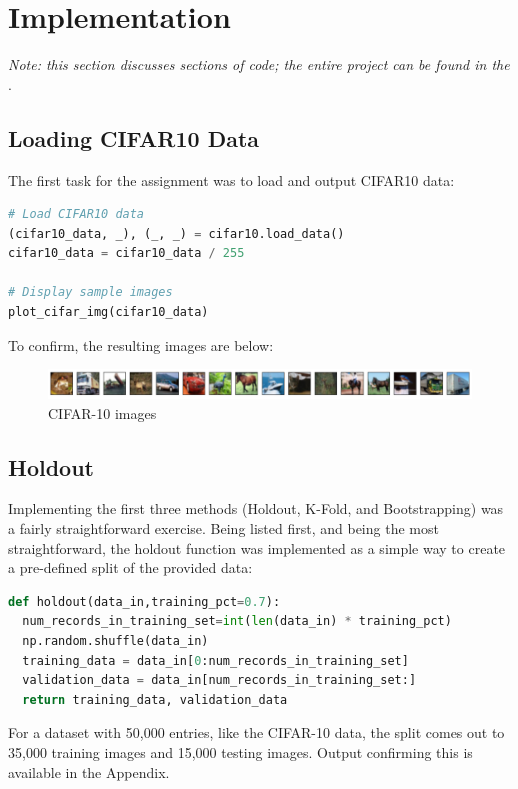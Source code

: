 \documentclass{article}
\begin{document}
\section{Implementation} \label{impl}
\textit{Note: this section discusses sections of code; the entire project can be found in the }.
\subsection{Loading CIFAR10 Data}
The first task for the assignment was to load and output CIFAR10 data:
\begin{lstlisting}[language=Python]
# Load CIFAR10 data
(cifar10_data, _), (_, _) = cifar10.load_data()
cifar10_data = cifar10_data / 255

# Display sample images
plot_cifar_img(cifar10_data)
\end{lstlisting}
To confirm, the resulting images are below:

\begin{figure}[H]
    \centering
    \includegraphics[width=6in]{csci-8920/hw-1/images/8920-hw-1-cropped.png}
    \caption{CIFAR-10 images}
    \label{fig:data}
\end{figure}

\subsection{Holdout}
Implementing the first three methods (Holdout, K-Fold, and Bootstrapping) was a fairly straightforward exercise.
Being listed first, and being the most straightforward, the holdout function was implemented as a simple way to create a pre-defined split of the provided data:
\begin{lstlisting}[language=Python]
def holdout(data_in,training_pct=0.7):
  num_records_in_training_set=int(len(data_in) * training_pct)
  np.random.shuffle(data_in)
  training_data = data_in[0:num_records_in_training_set]
  validation_data = data_in[num_records_in_training_set:]
  return training_data, validation_data
\end{lstlisting}

For a dataset with 50,000 entries, like the CIFAR-10 data, the split comes out to 35,000 training images and 15,000 testing images.
Output confirming this is available in the  Appendix.
\end{document}
